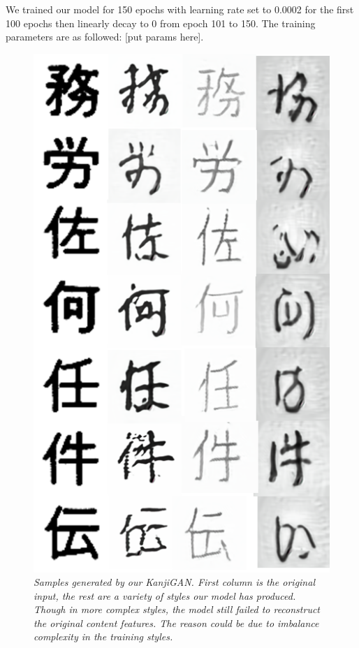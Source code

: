 \documentclass[12pt]{report}
\begin{document}
We trained our model for 150 epochs with learning rate set to 0.0002 for the first 100 epochs then linearly decay to 0 from epoch 101 to 150. The training parameters are as followed: [put params here]. 

\begin{figure}[H]
	\centering
	\includegraphics[scale=0.9]{kanji-gan-results}
	\caption{\textit{Samples generated by our KanjiGAN. First column is the original input, the rest are a variety of styles our model has produced. Though in more complex styles, the model still failed to reconstruct the original content features. The reason could be due to imbalance complexity in the training styles.}}
	\label{fig:kanji-gan-results}
\end{figure}
\end{document}
